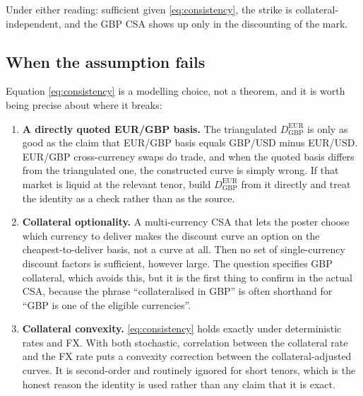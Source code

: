 \documentclass[11pt]{article}
\newcommand{\D}[2]{D_{#1}^{#2}}
\begin{document}
Under either reading: sufficient given \eqref{eq:consistency}, the strike is
collateral-independent, and the GBP CSA shows up only in the discounting of the mark.

\subsection{When the assumption fails}

Equation \eqref{eq:consistency} is a modelling choice, not a theorem, and it is worth
being precise about where it breaks:

\begin{enumerate}[label=\arabic*.,leftmargin=*]
\item \textbf{A directly quoted EUR/GBP basis.} The triangulated
  $\D{\mathrm{GBP}}{\mathrm{EUR}}$ is only as good as the claim that EUR/GBP basis equals
  GBP/USD minus EUR/USD. EUR/GBP cross-currency swaps do trade, and when the quoted basis
  differs from the triangulated one, the constructed curve is simply wrong. If that market
  is liquid at the relevant tenor, build $\D{\mathrm{GBP}}{\mathrm{EUR}}$ from it directly
  and treat the identity as a check rather than as the source.
\item \textbf{Collateral optionality.} A multi-currency CSA that lets the poster choose
  which currency to deliver makes the discount curve an option on the cheapest-to-deliver
  basis, not a curve at all. Then no set of single-currency discount factors is
  sufficient, however large. The question specifies GBP collateral, which avoids this,
  but it is the first thing to confirm in the actual CSA, because the phrase ``collateralised
  in GBP'' is often shorthand for ``GBP is one of the eligible currencies''.
\item \textbf{Collateral convexity.} \eqref{eq:consistency} holds exactly under
  deterministic rates and FX. With both stochastic, correlation between the collateral
  rate and the FX rate puts a convexity correction between the collateral-adjusted
  curves. It is second-order and routinely ignored for short tenors, which is the honest
  reason the identity is used rather than any claim that it is exact.
\end{enumerate}
\end{document}
